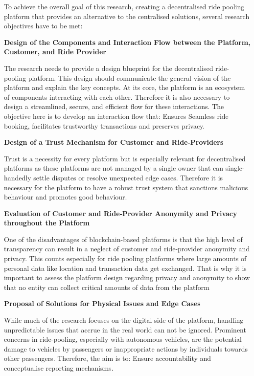 To achieve the overall goal of this research, creating a decentralised ride pooling platform that provides an alternative to the centralised solutions, several research objectives have to be met:

\textbf{Design of the Components and Interaction Flow between the Platform, Customer, and Ride Provider}

The research needs to provide a design blueprint for the decentralised ride-pooling platform. This design should communicate the general vision of the platform and explain the key concepts.
At its core, the platform is an ecosystem of components interacting with each other. 
Therefore it is also necessary to design a streamlined, secure, and efficient flow for these interactions. The objective here is to develop an interaction flow that: Ensures Seamless ride booking, facilitates trustworthy transactions and preserves privacy.


\textbf{Design of a Trust Mechanism for Customer and Ride-Providers}

Trust is a necessity for every platform but is especially relevant for decentralised platforms as these platforms are not managed by a single owner that can single-handedly  settle disputes or resolve unexpected edge cases. Therefore it is necessary for the platform to have a robust trust system that sanctions malicious behaviour and promotes  good behaviour.


\textbf{Evaluation of Customer and Ride-Provider Anonymity and Privacy throughout the Platform}

One of the disadvantages of blockchain-based platforms is that the high level of transparency can result in a neglect of customer and ride-provider anonymity and privacy. This counts especially for ride pooling platforms where large amounts of personal data like location and transaction data get exchanged. That is why it is important to assess the platform design regarding privacy and anonymity to show that no entity can collect critical amounts of data from the platform


\textbf{Proposal of Solutions for Physical Issues and Edge Cases}

While much of the research focuses on the digital side of the platform,  handling unpredictable issues that accrue in the real world can not be ignored. Prominent concerns in ride-pooling, especially with autonomous vehicles, are the potential damage to vehicles by passengers or inappropriate actions by individuals towards other passengers. Therefore, the aim is to: Ensure accountability and conceptualise reporting mechanisms.

